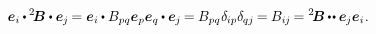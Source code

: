 \nopagebreak\vspace{-0.2em}
\begin{equation}\label{tensorcomponents}
\bm{e}_i
\hspace{-0.1ex} \dotp \hspace{-0.1ex}
{^2\!\bm{B}}
\dotp
\bm{e}_{\hspace{-0.1ex}j} \hspace{-0.2ex}
=
\bm{e}_i
\hspace{-0.1ex} \dotp
B_{pq}\bm{e}_p\bm{e}_q
\hspace{-0.1ex} \dotp
\bm{e}_{\hspace{-0.1ex}j} \hspace{-0.2ex}
= \hspace{-0.1ex}
B_{pq} \hspace{.1ex}
\delta_{\hspace{-0.1ex}ip}
\delta_{\hspace{-0.1ex}qj} \hspace{-0.2ex}
= \hspace{-0.1ex}
B_{i\hspace{-0.1ex}j} \hspace{-0.2ex}
=
{^2\!\bm{B}}
\hspace{-0.1ex} \dotdotp
\bm{e}_{\hspace{-0.1ex}j}
\bm{e}_i
\hspace{.1ex} .
\end{equation}
